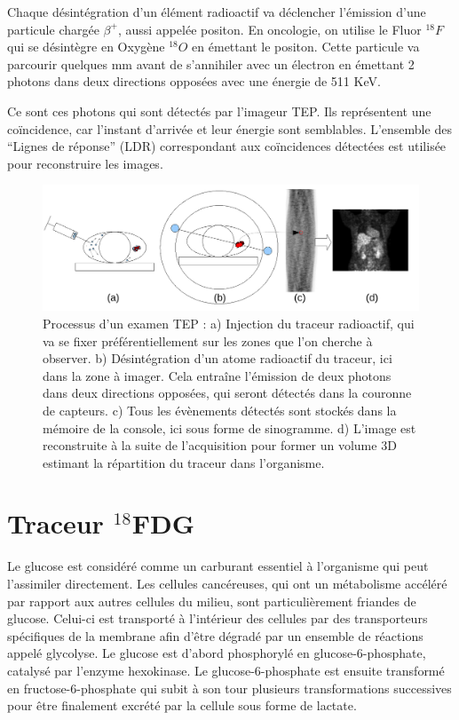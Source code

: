 Chaque désintégration d'un élément radioactif va déclencher l'émission d'une particule chargée $\beta^+$, aussi appelée positon. En oncologie, on utilise le Fluor $^{18}F$ qui se désintègre en Oxygène $^{18}O$ en émettant le positon. Cette particule va parcourir quelques mm avant de s'annihiler avec un électron en émettant 2 photons dans deux directions opposées avec une énergie de 511 KeV.

Ce sont ces photons qui sont détectés par l'imageur TEP. Ils représentent une coïncidence, car l'instant d'arrivée et leur énergie sont semblables. L'ensemble des ``Lignes de réponse'' (LDR) correspondant aux coïncidences détectées est utilisée pour reconstruire les images.

\begin{figure}
\centering
\includegraphics[width=16cm]{images/schemaTEP}
\caption[Présentation simplifiée de la TEP]{Processus d'un examen TEP : a) Injection du traceur radioactif, qui va se fixer préférentiellement sur les zones que l'on cherche à observer. b) Désintégration d'un atome radioactif du traceur, ici dans la zone à imager. Cela entraîne l'émission de deux photons dans deux directions opposées, qui seront détectés dans la couronne de capteurs. c) Tous les évènements détectés sont stockés dans la mémoire de la console, ici sous forme de sinogramme. d) L'image est reconstruite à la suite de l'acquisition pour former un volume 3D estimant la répartition du traceur dans l'organisme.}
\label{fig:schemaTEP}
\end{figure}


\section{Traceur $^{18}$FDG}

Le glucose est considéré comme un carburant essentiel à l’organisme qui peut l’assimiler directement. Les cellules cancéreuses, qui ont un métabolisme accéléré par rapport aux autres cellules du milieu, sont particulièrement friandes de glucose. Celui-ci est transporté à l’intérieur des cellules par des transporteurs spécifiques de la membrane afin d’être dégradé par un ensemble de réactions appelé glycolyse. Le glucose est d’abord phosphorylé en glucose-6-phosphate, catalysé par l’enzyme hexokinase. Le glucose-6-phosphate est ensuite transformé en fructose-6-phosphate qui subit à son tour plusieurs transformations successives pour être finalement excrété par la cellule sous forme de lactate.

